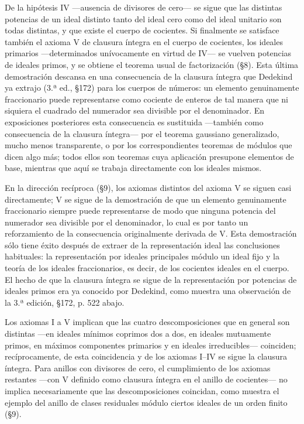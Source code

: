 \documentclass[11pt]{article}
\begin{document}
De la hipótesis IV ---ausencia de divisores de cero--- se sigue que las distintas potencias de un ideal distinto tanto del ideal cero como del ideal unitario son todas distintas, y que existe el cuerpo de cocientes. Si finalmente se satisface también el axioma V de clausura íntegra en el cuerpo de cocientes, los ideales primarios ---determinados unívocamente en virtud de IV--- se vuelven potencias de ideales primos, y se obtiene el teorema usual de factorización (§8). Esta última demostración descansa en una consecuencia de la clausura íntegra que Dedekind ya extrajo (3.ª ed., §172) para los cuerpos de números: un elemento genuinamente fraccionario puede representarse como cociente de enteros de tal manera que ni siquiera el cuadrado del numerador sea divisible por el denominador. En exposiciones posteriores esta consecuencia es sustituida ---también como consecuencia de la clausura íntegra--- por el teorema gaussiano generalizado, mucho menos transparente, o por los correspondientes teoremas de módulos que dicen algo más; todos ellos son teoremas cuya aplicación presupone elementos de base, mientras que aquí se trabaja directamente con los ideales mismos.

En la dirección recíproca (§9), los axiomas distintos del axioma V se siguen casi directamente; V se sigue de la demostración de que un elemento genuinamente fraccionario siempre puede representarse de modo que ninguna potencia del numerador sea divisible por el denominador, lo cual es por tanto un reforzamiento de la consecuencia originalmente derivada de V. Esta demostración sólo tiene éxito después de extraer de la representación ideal las conclusiones habituales: la representación por ideales principales módulo un ideal fijo y la teoría de los ideales fraccionarios, es decir, de los cocientes ideales en el cuerpo. El hecho de que la clausura íntegra se sigue de la representación por potencias de ideales primos era ya conocido por Dedekind, como muestra una observación de la 3.ª edición, §172, p. 522 abajo.

Los axiomas I a V implican que las cuatro descomposiciones que en general son distintas ---en ideales mínimos coprimos dos a dos, en ideales mutuamente primos, en máximos componentes primarios y en ideales irreducibles--- coinciden; recíprocamente, de esta coincidencia y de los axiomas I--IV se sigue la clausura íntegra. Para anillos con divisores de cero, el cumplimiento de los axiomas restantes ---con V definido como clausura íntegra en el anillo de cocientes--- no implica necesariamente que las descomposiciones coincidan, como muestra el ejemplo del anillo de clases residuales módulo ciertos ideales de un orden finito (§9).
\end{document}

